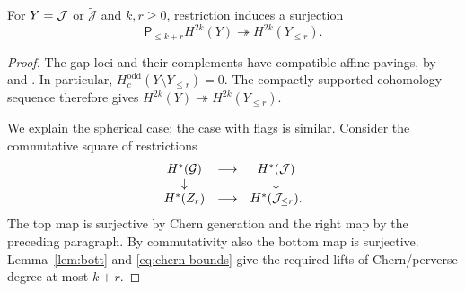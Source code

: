 \documentclass[a4paper,11pt,leqno]{amsart}
\newcommand{\tJ}{\widetilde{\mathcal J}}\newcommand{\DR}{DR_n}
\begin{document}
\begin{lem}\label{lem:restriction}
For $Y=\mathcal J$ or $\tJ$ and $k,r\ge0$, restriction induces a surjection
\[
 \mathsf{P}_{\le k+r}H^{2k}(Y)\twoheadrightarrow H^{2k}(Y_{\le r}).
\]
\end{lem}
\begin{proof}
The gap loci and their complements have compatible affine pavings,
by \cite{Hikita} and \cite[\S8.3, Theorem 8.3]{KTpublished}. In particular,
$H_c^{\mathrm{odd}}(Y\setminus Y_{\le r})=0$. The compactly supported
cohomology sequence therefore gives
$H^{2k}(Y)\twoheadrightarrow H^{2k}(Y_{\le r})$.

We explain the spherical case; the case with flags is similar. Consider the commutative square of restrictions
\[
 \begin{array}{ccc}
 H^*(\mathcal G)&\longrightarrow&H^*(\mathcal J)\\
 \downarrow&&\downarrow\\
 H^*(Z_r)&\longrightarrow&H^*(\mathcal J_{\le r}).
 \end{array}
\]
The top map is surjective by Chern generation and the right map by
the preceding paragraph. By commutativity also
the bottom map is surjective. Lemma~\ref{lem:bott} and
\eqref{eq:chern-bounds} give the required lifts of Chern/perverse degree
at most $k+r$.
\end{proof}
\end{document}

